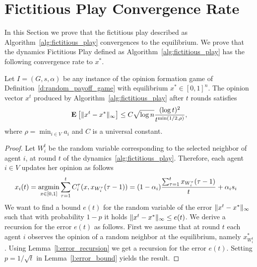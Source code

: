 \section{Fictitious Play Convergence Rate}\label{s:fictitious_convergence}

In this Section we prove that the fictitious play described as
Algorithm~\ref{alg:fictitious_play} convergences to the equilibrium.
We prove that the dynamics Fictitious Play defined as
Algorithm~\ref{alg:fictitious_play} has the following convergence rate to $x^*$.
\begin{theorem}
  Let $I = (G,s, \alpha)$ be any instance of the opinion formation
  game of Definition~\ref{d:random_payoff_game} with equilibrium
  $x^* \in [0,1]^n$.  The opinion vector $x^t$ produced by
  Algorithm~\ref{alg:fictitious_play} after $t$ rounds satisfies
  \[
    \bm{\mathrm{E}}_{} \left[ \| x^t - x^* \|_{\infty} \right] \leq
    C \sqrt{\log n}\frac{(\log t)^{2}}{t^{\min(1/2,\rho)}},
  \]
  where $\rho = \min_{i \in V} a_i$ and $C$ is a universal constant.
\end{theorem}
\begin{proof}
  Let $W_i^t$ be the random variable corresponding to the selected neighbor
  of agent $i$, at round $t$ of the dynamics~\ref{alg:fictitious_play}.
  Therefore, each agent $i \in V$ updates her opinion as follows
  \begin{align*}
    x_i(t)
    &=
    \operatorname*{argmin}_{x \in [0,1]}
      \sum_{\tau=1}^tC^{\tau}_i(x,x_{W_i^{\tau}}(\tau-1))
    =
    (1-\alpha_i)\frac{\sum_{\tau=1}^{t} x_{W_i^\tau}(\tau-1)}{t}
    + \alpha_i s_i
  \end{align*}
  We want to find a bound $e(t)$ for the random variable
  of the error $\| x^t - x^* \|_{\infty}$ such that with probability
  $1-p$ it holds $\| x^t - x^* \|_{\infty} \leq e(t)$.
  We derive a recursion for the error $e(t)$ as follows.
  First we assume that at round $t$ each agent $i$ observes
  the opinion of a random neighbor at the equilibrium, namely
  $x^*_{W_i^t}$.
  Using Lemma~\ref{l:error_recursion} we get a recursion for
  the error $e(t)$.  Setting $p = 1/\sqrt{t}$
  in Lemma~\ref{l:error_bound} yields the result.
\end{proof}

